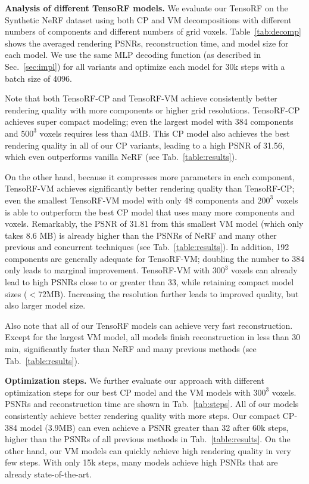 \documentclass[runningheads]{llncs}
\newcommand{\boldstartspace}[1]{\vspace{0.1in}\noindent\textbf{#1}}
\begin{document}
\boldstartspace{Analysis of different TensoRF models.}
We evaluate our TensoRF on the Synthetic NeRF dataset \cite{mildenhall2020nerf} using both CP and VM decompositions with different numbers of components and different numbers of grid voxels.
Table~\ref{tab:decomp} shows the averaged rendering PSNRs, reconstruction time, and model size for each model. We use the same MLP decoding function (as described in Sec.~\ref{sec:impl}) for all variants and optimize each model for 30k steps with a batch size of 4096.

Note that both TensoRF-CP and TensoRF-VM achieve consistently better rendering quality with more components or higher grid resolutions. 
TensoRF-CP achieves super compact modeling; even the largest model with 384 components and $500^3$ voxels requires less than 4MB.
This CP model also achieves the best rendering quality in all of our CP variants, leading to a high PSNR of 31.56, which even outperforms vanilla NeRF (see Tab.~\ref{table:results}).

On the other hand, because it compresses more parameters in each component, TensoRF-VM achieves significantly better rendering quality than TensoRF-CP; even the smallest TensoRF-VM model with only 48 components and $200^3$ voxels is able to outperform the best CP model that uses many more components and voxels.
Remarkably, the PSNR of 31.81 from this smallest VM model (which only takes $8.6$ MB) is already higher than the PSNRs of NeRF and many other previous and concurrent techniques (see Tab.~\ref{table:results}). 
In addition, 192 components are generally adequate for TensoRF-VM; doubling the number to 384 only leads to marginal improvement. 
TensoRF-VM with $300^3$ voxels can already lead to high PSNRs close to or greater than 33, while retaining compact model sizes ($<$72MB).
Increasing the resolution further leads to improved quality, but also larger model size.

Also note that all of our TensoRF models can achieve very fast reconstruction. Except for the largest VM model, all models finish reconstruction in less than 30 min, significantly faster than NeRF and many previous methods (see Tab.~\ref{table:results}). 


\boldstartspace{Optimization steps.}
We further evaluate our approach with different optimization steps for our best CP model and the VM models with $300^3$ voxels. PSNRs and reconstruction time are shown in Tab.~\ref{tab:steps}.
All of our models consistently achieve better rendering quality with more steps.
Our compact CP-384 model (3.9MB) can even achieve a PSNR greater than 32 after 60k steps, higher than the PSNRs of all previous methods in Tab.~\ref{table:results}.
On the other hand, our VM models can quickly achieve high rendering quality in very few steps. With only 15k steps, many models achieve high PSNRs that are already state-of-the-art.
\end{document}
